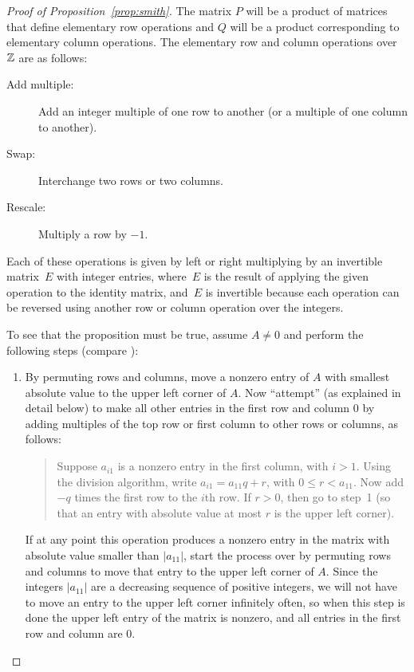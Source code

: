 \begin{proof}[Proof of Proposition~\ref{prop:smith}]
The matrix $P$ will be a product of matrices that define elementary
row operations and $Q$ will be a product corresponding to elementary
column operations.  The elementary row and column operations over
$\mathbb{Z}$ are as follows:
\begin{description}
	\item[Add multiple:]
		Add an integer multiple of one row to another
		(or a multiple of one column to another).
	\item[Swap:]
		Interchange two rows or two columns.
	\item[Rescale:]
		Multiply a row by $-1$.
\end{description}
Each of these operations is given by left or right multiplying by an
invertible matrix~$E$ with integer entries, where~$E$ is the result of
applying the given operation to the identity matrix, and~$E$ is
invertible because each operation can be reversed using another row or
column operation over the integers.

To see that the proposition must be true, assume $A\neq 0$ and perform
the following steps (compare \cite[pg.~459]{artin:algebra}):
\begin{enumerate}
	\item By permuting rows and columns, move a nonzero entry of $A$ with
	smallest absolute value to the upper left corner of $A$.  Now
	``attempt'' (as explained in detail below) to make all other entries
	in the first row and column $0$ by adding multiples of the top row
	or first column to other rows or columns, as follows:
	\begin{quote}
		Suppose $a_{i1}$ is a nonzero entry in the first column, with
		$i>1$.  Using the division algorithm, write
		$a_{i1} = a_{11}q + r$, with $0\leq r < a_{11}$. Now add $-q$
		times the first row to the $i$th row. If $r>0$, then go to step~1
		(so that an entry with absolute value at most $r$ is the upper
		left corner).
	\end{quote}
	If at any point this operation produces a nonzero entry in the
	matrix with absolute value smaller than $|a_{11}|$, start the
	process over by permuting rows and columns to move that entry to the
	upper left corner of $A$.  Since the integers $|a_{11}|$ are a
	decreasing sequence of positive integers, we will not have to move
	an entry to the upper left corner infinitely often, so when this
	step is done the upper left entry of the matrix is nonzero, and all
	entries in the first row and column are $0$.
	

\end{enumerate}
\end{proof}
